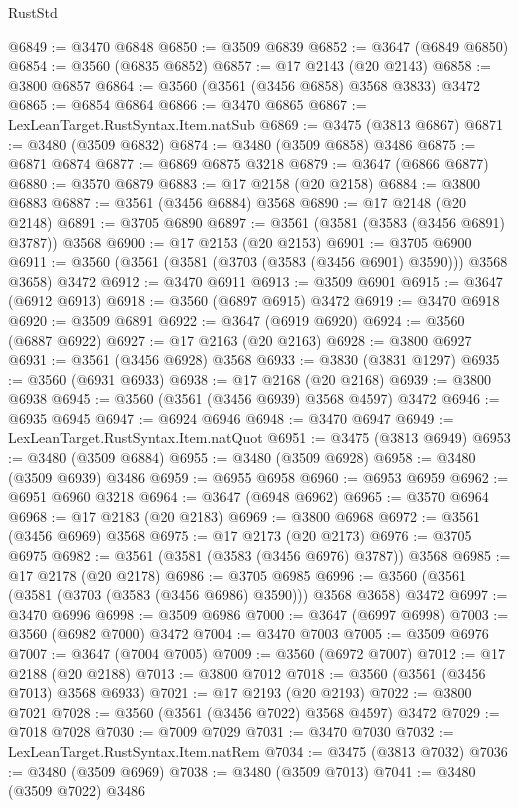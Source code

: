 \begin{lexlean}{RustStd}
\begin{coremodule}
@6849 := @3470 @6848
@6850 := @3509 @6839
@6852 := @3647 (@6849 @6850)
@6854 := @3560 (@6835 @6852)
@6857 := @17 @2143 (@20 @2143)
@6858 := @3800 @6857
@6864 := @3560 (@3561 (@3456 @6858) @3568 @3833) @3472
@6865 := @6854 @6864
@6866 := @3470 @6865
@6867 := LexLeanTarget.RustSyntax.Item.natSub
@6869 := @3475 (@3813 @6867)
@6871 := @3480 (@3509 @6832)
@6874 := @3480 (@3509 @6858) @3486
@6875 := @6871 @6874
@6877 := @6869 @6875 @3218
@6879 := @3647 (@6866 @6877)
@6880 := @3570 @6879
@6883 := @17 @2158 (@20 @2158)
@6884 := @3800 @6883
@6887 := @3561 (@3456 @6884) @3568
@6890 := @17 @2148 (@20 @2148)
@6891 := @3705 @6890
@6897 := @3561 (@3581 (@3583 (@3456 @6891) @3787)) @3568
@6900 := @17 @2153 (@20 @2153)
@6901 := @3705 @6900
@6911 := @3560 (@3561 (@3581 (@3703 (@3583 (@3456 @6901) @3590))) @3568 @3658) @3472
@6912 := @3470 @6911
@6913 := @3509 @6901
@6915 := @3647 (@6912 @6913)
@6918 := @3560 (@6897 @6915) @3472
@6919 := @3470 @6918
@6920 := @3509 @6891
@6922 := @3647 (@6919 @6920)
@6924 := @3560 (@6887 @6922)
@6927 := @17 @2163 (@20 @2163)
@6928 := @3800 @6927
@6931 := @3561 (@3456 @6928) @3568
@6933 := @3830 (@3831 @1297)
@6935 := @3560 (@6931 @6933)
@6938 := @17 @2168 (@20 @2168)
@6939 := @3800 @6938
@6945 := @3560 (@3561 (@3456 @6939) @3568 @4597) @3472
@6946 := @6935 @6945
@6947 := @6924 @6946
@6948 := @3470 @6947
@6949 := LexLeanTarget.RustSyntax.Item.natQuot
@6951 := @3475 (@3813 @6949)
@6953 := @3480 (@3509 @6884)
@6955 := @3480 (@3509 @6928)
@6958 := @3480 (@3509 @6939) @3486
@6959 := @6955 @6958
@6960 := @6953 @6959
@6962 := @6951 @6960 @3218
@6964 := @3647 (@6948 @6962)
@6965 := @3570 @6964
@6968 := @17 @2183 (@20 @2183)
@6969 := @3800 @6968
@6972 := @3561 (@3456 @6969) @3568
@6975 := @17 @2173 (@20 @2173)
@6976 := @3705 @6975
@6982 := @3561 (@3581 (@3583 (@3456 @6976) @3787)) @3568
@6985 := @17 @2178 (@20 @2178)
@6986 := @3705 @6985
@6996 := @3560 (@3561 (@3581 (@3703 (@3583 (@3456 @6986) @3590))) @3568 @3658) @3472
@6997 := @3470 @6996
@6998 := @3509 @6986
@7000 := @3647 (@6997 @6998)
@7003 := @3560 (@6982 @7000) @3472
@7004 := @3470 @7003
@7005 := @3509 @6976
@7007 := @3647 (@7004 @7005)
@7009 := @3560 (@6972 @7007)
@7012 := @17 @2188 (@20 @2188)
@7013 := @3800 @7012
@7018 := @3560 (@3561 (@3456 @7013) @3568 @6933)
@7021 := @17 @2193 (@20 @2193)
@7022 := @3800 @7021
@7028 := @3560 (@3561 (@3456 @7022) @3568 @4597) @3472
@7029 := @7018 @7028
@7030 := @7009 @7029
@7031 := @3470 @7030
@7032 := LexLeanTarget.RustSyntax.Item.natRem
@7034 := @3475 (@3813 @7032)
@7036 := @3480 (@3509 @6969)
@7038 := @3480 (@3509 @7013)
@7041 := @3480 (@3509 @7022) @3486

\end{coremodule}
\end{lexlean}
